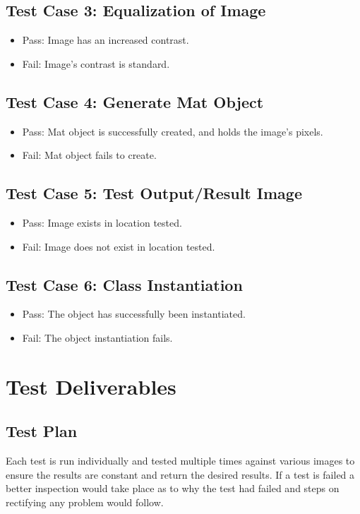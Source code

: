 \documentclass[a4paper,12pt]{report}
\begin{document}
	\subsection{Test Case 3: Equalization of Image}
		\begin {itemize}
			\item Pass: Image has an increased contrast.
			\item Fail: Image's contrast is standard.
		\end {itemize}
	\subsection{Test Case 4: Generate Mat Object}
		\begin {itemize}
			\item Pass: Mat object is successfully created, and holds the image's pixels.
			\item Fail: Mat object fails to create.
		\end {itemize}
	\subsection{Test Case 5: Test Output/Result Image}
		\begin {itemize}
			\item Pass: Image exists in location tested.
			\item Fail: Image does not exist in location tested.
		\end {itemize}
	\subsection{Test Case 6: Class Instantiation}
		\begin {itemize}
			\item Pass: The object has successfully been instantiated.
			\item Fail: The object instantiation fails.
		\end {itemize}
	
\section{Test Deliverables}
	\subsection {Test Plan}
		Each test is run individually and tested multiple times against various images to ensure the results are constant and return the desired results. If a test is failed a better inspection would take place as to why the test had failed and steps on rectifying any problem would follow.
		
\end{document}
